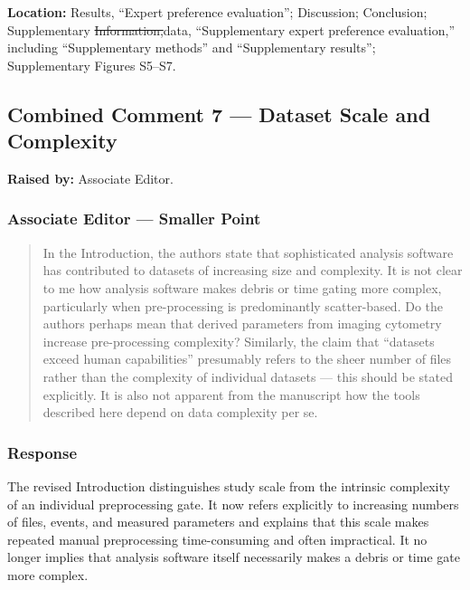 \documentclass[
  11pt,
  a4paper,
]{article}
\begin{document}
\textbf{Location:} {\color{revisionblue}Results, ``Expert preference
evaluation''; Discussion; Conclusion;} Supplementary
{\color{revisionred}\sout{Information,}}{\color{revisionblue}data,}
``Supplementary expert preference evaluation,'' including
``Supplementary methods'' and ``Supplementary results''; Supplementary
Figures S5--S7.

\subsection{Combined Comment 7 --- Dataset Scale and
Complexity}\label{combined-comment-7--dataset-scale-and-complexity}

\textbf{Raised by:} Associate Editor.

\subsubsection{Associate Editor --- Smaller
Point}\label{associate-editor--smaller-point}

\begin{quote}
In the Introduction, the authors state that sophisticated analysis
software has contributed to datasets of increasing size and complexity.
It is not clear to me how analysis software makes debris or time gating
more complex, particularly when pre-processing is predominantly
scatter-based. Do the authors perhaps mean that derived parameters from
imaging cytometry increase pre-processing complexity? Similarly, the
claim that ``datasets exceed human capabilities'' presumably refers to
the sheer number of files rather than the complexity of individual
datasets --- this should be stated explicitly. It is also not apparent
from the manuscript how the tools described here depend on data
complexity per se.
\end{quote}

\subsubsection{Response}\label{response-6}

The revised Introduction distinguishes study scale from the intrinsic
complexity of an individual preprocessing gate. It now refers explicitly
to increasing numbers of files, events, and measured parameters and
explains that this scale makes repeated manual preprocessing
time-consuming and often impractical. It no longer implies that analysis
software itself necessarily makes a debris or time gate more complex.
\end{document}
